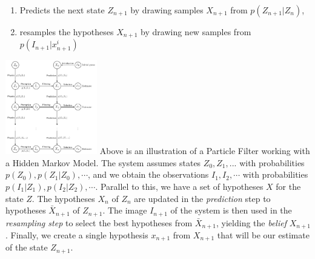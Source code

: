 \begin{enumerate}
  \item Predicts the next state $Z_{n+1}$ by drawing samples $X_{n+1}$ from $p(Z_{n+1} | Z_n)$,
  \item resamples the hypotheses $X_{n+1}$ by drawing new samples from $p\left(I_{n+1} | x_{n+1}^i\right)$
\end{enumerate}


\includegraphics[width=0.3\textwidth]{figures/hmm-graph/hmm-graph.pdf}
Above is an illustration of a Particle Filter working with a Hidden Markov Model. The system assumes states $Z_0, Z_1, ...$ with probabilities $p(Z_0), p(Z_1|Z_0), \cdots$, and we obtain the observations $I_1, I_2, \cdots$ with probabilities $p(I_1|Z_1), p(I_2|Z_2), \cdots$. Parallel to this, we have a set of hypotheses $X$ for the state $Z$. The hypotheses $X_n$ of $Z_n$ are updated in the \emph{prediction} step to hypotheses $\bar{X}_{n+1}$ of $Z_{n+1}$. The image $I_{n+1}$ of the system is then used in the \emph{resampling step} to select the best hypotheses from $\bar{X}_{n+1}$, yielding the \emph{belief} $X_{n+1}$. Finally, we create a single hypothesis $x_{n+1}$ from $X_{n+1}$ that will be our estimate of the state $Z_{n+1}$.

